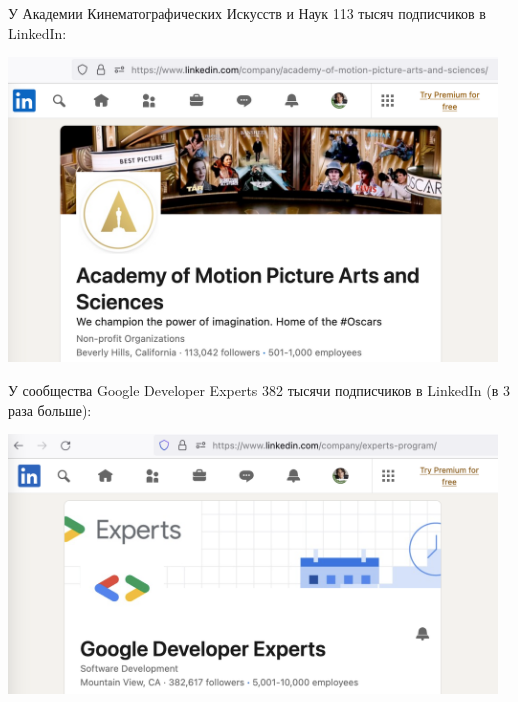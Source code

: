
У Академии Кинематографических Искусств и Наук 113 тысяч подписчиков в LinkedIn:

\includegraphics[width=35em]{linkedin-followers-academy}

У сообщества Google Developer Experts 382 тысячи подписчиков в LinkedIn (в 3 раза больше):

\includegraphics[width=35em]{linkedin-followers-gde}

\pagebreak
